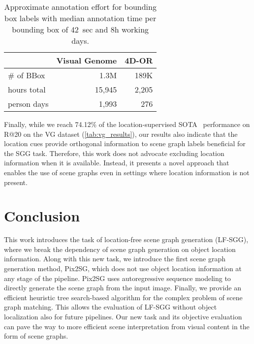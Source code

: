 \documentclass[10pt,twocolumn,letterpaper]{article}
\begin{document}
\begin{table}[ht]
  \centering
  \begin{tabular}{l r r}
  \toprule
    & Visual Genome & 4D-OR \\
    \midrule
\# of BBox & 1.3M & 189K \\
hours total & 15,945 & 2,205 \\
person days & 1,993 & 276 \\
\bottomrule
  \end{tabular}
  \caption{Approximate annotation effort for bounding box labels with median annotation time per bounding box of 42~sec and 8h working days.}
  \label{tab:annotation_effort}
\end{table}

Finally, while we reach 74.12\% of the location-supervised SOTA~\cite{zellers_neural_2018,tang_unbiased_2020} performance on R@20 on the VG dataset (\cref{tab:vg_results}), our results also indicate that the location cues provide orthogonal information to scene graph labels beneficial for the SGG task. Therefore, this work does not advocate excluding location information when it is available. Instead, it presents a novel approach that enables the use of scene graphs even in settings where location information is not present.
 \section{Conclusion}
This work introduces the task of location-free scene graph generation (LF-SGG), where we break the dependency of scene graph generation on object location information. Along with this new task, we introduce the first scene graph generation method, Pix2SG, which does not use object location information at any stage of the pipeline. Pix2SG uses autoregressive sequence modeling to directly generate the scene graph from the input image. Finally, we provide an efficient heuristic tree search-based algorithm for the complex problem of scene graph matching. This allows the evaluation of LF-SGG without object localization also for future pipelines. Our new task and its objective evaluation can pave the way to more efficient scene interpretation from visual content in the form of scene graphs. 
{\small


}
\end{document}
